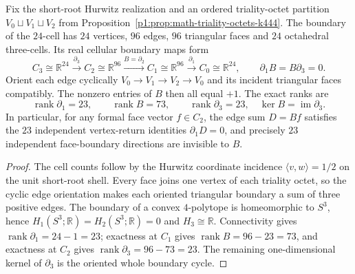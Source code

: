 \documentclass[11pt]{article}
\begin{document}
\begin{theorem}
\label{p1:thm:v235-hurwitz-chain-complex}
Fix the short-root Hurwitz realization and an ordered triality-octet
partition \(V_0\sqcup V_1\sqcup V_2\) from
Proposition~\ref{p1:prop:math-triality-octets-k444}.  The boundary
of the \(24\)-cell has \(24\) vertices, \(96\) edges, \(96\)
triangular faces and \(24\) octahedral three-cells.  Its real cellular
boundary maps form
\[
 C_3\cong\mathbb R^{24}\xrightarrow{\partial_3}
 C_2\cong\mathbb R^{96}\xrightarrow{B=\partial_2}
 C_1\cong\mathbb R^{96}\xrightarrow{\partial_1}
 C_0\cong\mathbb R^{24},
 \qquad \partial_1B=B\partial_3=0.
\]
Orient each edge cyclically \(V_0\to V_1\to V_2\to V_0\) and
its incident triangular faces compatibly.  The nonzero entries
of \(B\) then all equal \(+1\).  The exact ranks are
\[
 \operatorname{rank}\partial_1=23,\qquad
 \operatorname{rank}B=73,\qquad
 \operatorname{rank}\partial_3=23,
 \quad\ker B=\operatorname{im}\partial_3.
\]
In particular, for any formal face vector \(f\in C_2\), the edge
sum \(D=Bf\) satisfies the \(23\) independent vertex-return
identities \(\partial_1D=0\), and precisely \(23\) independent
face-boundary directions are invisible to \(B\).
\end{theorem}
\begin{proof}
The cell counts follow by the Hurwitz coordinate incidence
\(\langle v,w\rangle=1/2\) on the unit short-root shell.
Every face joins one vertex of each triality octet, so the cyclic
edge orientation makes each oriented triangular boundary a sum of
three positive edges.  The boundary of a convex \(4\)-polytope is
homeomorphic to \(S^3\), hence \(H_1(S^3;\mathbb R)=
H_2(S^3;\mathbb R)=0\) and \(H_3\cong\mathbb R\).
Connectivity gives \(\operatorname{rank}\partial_1=24-1=23\);
exactness at \(C_1\) gives \(\operatorname{rank}B=96-23=73\),
and exactness at \(C_2\) gives \(\operatorname{rank}\partial_3=
96-73=23\).  The remaining one-dimensional kernel of
\(\partial_3\) is the oriented whole boundary cycle.
\end{proof}
\end{document}
